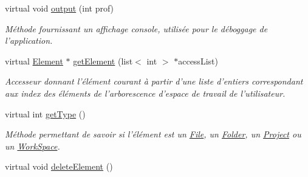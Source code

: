 \begin{DoxyCompactItemize}
virtual void \hyperlink{class_element_a4df80942062589e32af1c9a90a08583d}{output} (int prof)
\begin{DoxyCompactList}\small\item\em Méthode fournissant un affichage console, utilisée pour le déboggage de l'application. \item\end{DoxyCompactList}\item 
virtual \hyperlink{class_element}{Element} $\ast$ \hyperlink{class_element_a582b08ede581fddd1ffbb4ede68896a6}{getElement} (list$<$ int $>$ $\ast$accessList)
\begin{DoxyCompactList}\small\item\em Accesseur donnant l'élément courant à partir d'une liste d'entiers correspondant aux index des éléments de l'arborescence d'espace de travail de l'utilisateur. \item\end{DoxyCompactList}\item 
virtual int \hyperlink{class_element_a8bd9315dc4eb7b59f47410347375bf0e}{getType} ()
\begin{DoxyCompactList}\small\item\em Méthode permettant de savoir si l'élément est un \hyperlink{class_file}{File}, un \hyperlink{class_folder}{Folder}, un \hyperlink{class_project}{Project} ou un \hyperlink{class_work_space}{WorkSpace}. \item\end{DoxyCompactList}\item 
\hypertarget{class_element_a51b482e58e5d6bb8bc16b5ffe120cea4}{
virtual void \hyperlink{class_element_a51b482e58e5d6bb8bc16b5ffe120cea4}{deleteElement} ()}
\label{class_element_a51b482e58e5d6bb8bc16b5ffe120cea4}


\end{DoxyCompactItemize}
